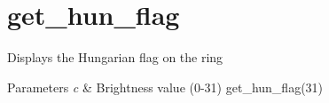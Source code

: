 \hypertarget{get_hun_flag-example}{\section{get\-\_\-hun\-\_\-flag}
}
Displays the Hungarian flag on the ring
\begin{DoxyParams}{Parameters}
{\em c} & Brightness value (0-\/31) get\-\_\-hun\-\_\-flag(31)\\
\hline
\end{DoxyParams}

\begin{DoxyCodeInclude}
\end{DoxyCodeInclude}
 